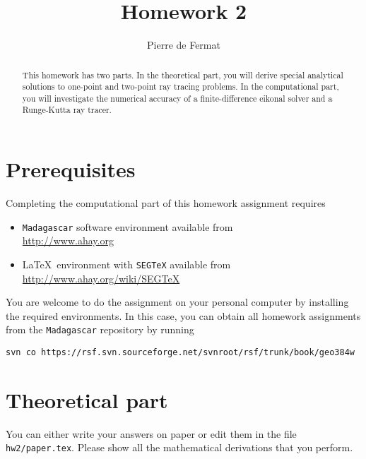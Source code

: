 \author{Pierre de Fermat} 
\title{Homework 2}

\begin{abstract}
  This homework has two parts. In the theoretical part, you will
  derive special analytical solutions to one-point and two-point ray
  tracing problems. In the computational part, you will investigate
  the numerical accuracy of a finite-difference eikonal solver and
  a Runge-Kutta ray tracer.
\end{abstract}

\section{Prerequisites}

Completing the computational part of this homework assignment requires
\begin{itemize}
\item \texttt{Madagascar} software environment available from \\
  \url{http://www.ahay.org}
\item \LaTeX\ environment with \texttt{SEGTeX} available from \\ 
  \url{http://www.ahay.org/wiki/SEGTeX}
\end{itemize}

You are welcome to do the assignment on your personal computer by
installing the required environments. In this case, you can obtain all
homework assignments from the \texttt{Madagascar} repository by running
\begin{verbatim}
svn co https://rsf.svn.sourceforge.net/svnroot/rsf/trunk/book/geo384w 
\end{verbatim}

\section{Theoretical part}

You can either write your answers on paper or edit them in the file
\verb#hw2/paper.tex#. Please show all the mathematical
derivations that you perform.

